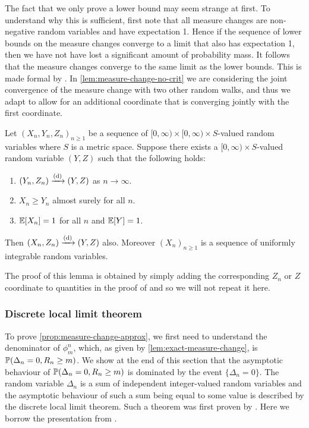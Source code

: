 The fact that we only prove a lower bound may seem strange at first. To understand why this is sufficient, first note that all measure changes are non-negative random variables and have expectation 1. Hence if the sequence of lower bounds on the measure changes converge to a limit that also has expectation 1, then we have not have lost a significant amount of probability mass. It follows that the measure changes converge to the same limit as the lower bounds. This is made formal by \citet[Lemma 4.8]{conchon--kerjanStableGraphMetric2020}. In \cref{lem:measure-change-no-crit} we are considering the joint convergence of the measure change with two other random walks, and thus we adapt \cite[Lemma 4.8]{conchon--kerjanStableGraphMetric2020} to allow for an additional coordinate that is converging jointly with the first coordinate.
\begin{lemma}
    \label{lem:sandwiching-lemma}
    Let $(X_n, Y_n, Z_n)_{n \geq 1}$ be a sequence of $[0, \infty) \times [0, \infty) \times S$-valued random variables where $S$ is a metric space. Suppose there exists a $[0, \infty) \times S$-valued random variable $(Y, Z)$ such that the following holds:
    \begin{enumerate}
        \item $(Y_n, Z_n) \todist (Y, Z)$ as $n \to \infty$.
        \item $X_n \geq Y_n$ almost surely for all $n$.
        \item $\E[X_n] = 1$ for all $n$ and $\E[Y] = 1$.
    \end{enumerate}
    Then $(X_n, Z_n) \todist (Y, Z)$ also. Moreover $(X_n)_{n \geq 1}$ is a sequence of uniformly integrable random variables.
\end{lemma}
The proof of this lemma is obtained by simply adding the corresponding $Z_n$ or $Z$ coordinate to quantities in the proof of \cite[Lemma 4.8]{conchon--kerjanStableGraphMetric2020} and so we will not repeat it here.

\subsubsection{Discrete local limit theorem}

To prove \cref{prop:measure-change-approx}, we first need to understand the denominator of $\phi^n_m$, which, as given by \cref{lem:exact-measure-change}, is $\P(\Delta_n = 0, R_n \geq m)$. We show at the end of this section that the asymptotic behaviour of $\P(\Delta_n = 0, R_n \geq m)$ is dominated by the event $\{\Delta_n = 0\}$. The random variable $\Delta_n$ is a sum of independent integer-valued random variables and the asymptotic behaviour of such a sum being equal to some value is described by the discrete local limit theorem. Such a theorem was first proven by \citet{gnedenkoLocalLimitTheorem1948}. Here we borrow the presentation from \citet[Section 3.5]{durrettProbabilityTheoryExamples2019}.

